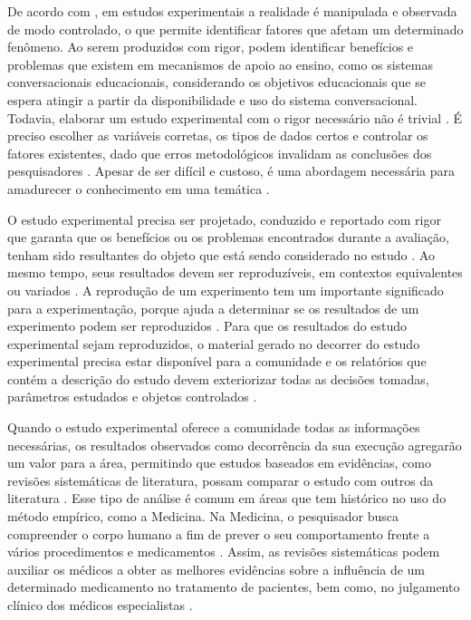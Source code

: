 De acordo com , em estudos experimentais a realidade é manipulada e observada de modo controlado, o que permite identificar fatores que afetam um determinado fenômeno. Ao serem produzidos com rigor, podem identificar benefícios e problemas que existem em mecanismos de apoio ao ensino, como os sistemas conversacionais educacionais, considerando os objetivos educacionais que se espera atingir a partir da disponibilidade e uso do sistema conversacional. Todavia, elaborar um estudo experimental com o rigor necessário não é trivial \cite{Vegas}. É preciso escolher as variáveis corretas, os tipos de dados certos e controlar os fatores existentes, dado que erros metodológicos invalidam as conclusões dos pesquisadores \cite{Kitchenham:2002}. Apesar de ser difícil e custoso, é uma abordagem necessária para amadurecer o conhecimento em uma temática \cite{Basili:1998}.

O estudo experimental precisa ser projetado, conduzido e reportado com rigor que garanta que os benefícios ou os problemas encontrados durante a avaliação, tenham sido resultantes do objeto que está sendo considerado no estudo \cite{493439, Wohlin}. Ao mesmo tempo, seus resultados devem ser reproduzíveis, em contextos equivalentes ou variados \cite{Carver:2014}. A reprodução de um experimento tem um importante significado para a experimentação, porque ajuda a determinar se os resultados de um experimento podem ser reproduzidos \cite{juristo2010}. Para que os resultados do estudo experimental sejam reproduzidos, o material gerado no decorrer do estudo experimental precisa estar disponível para a comunidade e os relatórios que contém a descrição do estudo devem exteriorizar todas as decisões tomadas, parâmetros estudados e objetos controlados \cite{SHEPPERD2018120}. 

Quando o estudo experimental oferece a comunidade todas as informações necessárias, os resultados observados como decorrência da sua execução agregarão um valor para a área, permitindo que estudos baseados em evidências, como revisões sistemáticas de literatura, possam comparar o estudo com outros da literatura \cite{Kitchenham:2004}. Esse tipo de análise é comum em áreas que tem histórico no uso do método empírico, como a Medicina. Na Medicina, o pesquisador busca compreender o corpo humano a fim de prever o seu comportamento frente a vários procedimentos e medicamentos \cite{493439}. Assim, as revisões sistemáticas podem auxiliar os médicos a obter as melhores evidências sobre a influência de um determinado medicamento no tratamento de pacientes, bem como, no julgamento clínico dos médicos especialistas \cite{Kitchenham:2004}. 

